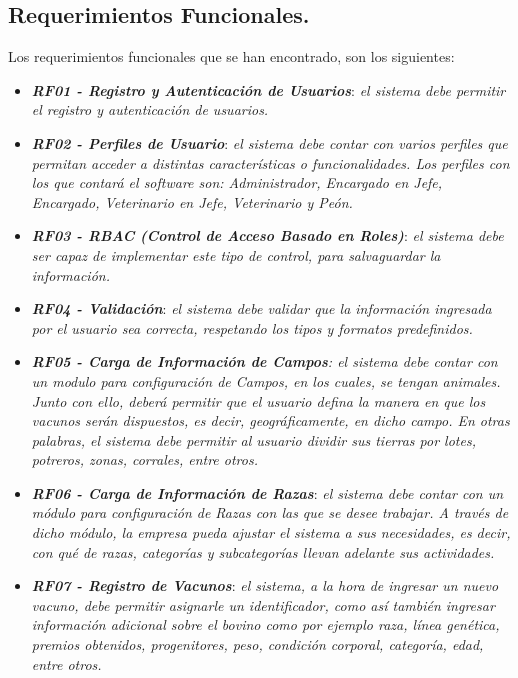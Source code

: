 \documentclass[11pt,oneside]{book}
\begin{document}
\subsection{Requerimientos Funcionales.}
Los requerimientos funcionales que se han encontrado, son los siguientes:
\begin{itemize}

\item \textit{\textbf{RF01 - Registro y Autenticación de Usuarios}}: \textit{el sistema debe permitir el registro y autenticación de usuarios.}

\item \textit{\textbf{RF02 - Perfiles de Usuario}}: \textit{el sistema debe contar con varios perfiles que permitan acceder a distintas características o funcionalidades. Los perfiles con los que contará el software son: Administrador, Encargado en Jefe, Encargado, Veterinario en Jefe, Veterinario y Peón.}
\newpage
\item \textit{\textbf{RF03 - RBAC (Control de Acceso Basado en Roles)}}: \textit{el sistema debe ser capaz de implementar este tipo de control, para salvaguardar la información.}

\item \textit{\textbf{RF04 - Validación}}: \textit{el sistema debe validar que la información ingresada por el usuario sea correcta, respetando los tipos y formatos predefinidos.}

\item \textit{\textbf{RF05 - Carga de Información de Campos}: el sistema debe contar con un modulo para configuración de Campos, en los cuales, se tengan animales. Junto con ello, deberá permitir que el usuario defina la manera en que los vacunos serán dispuestos, es decir, geográficamente, en dicho campo. En otras palabras, el sistema debe permitir al usuario dividir sus tierras por lotes, potreros, zonas, corrales, entre otros.}

\item \textit{\textbf{RF06 - Carga de Información de Razas}}: \textit{el sistema debe contar con un módulo para configuración de Razas con las que se desee trabajar. A través de dicho módulo, la empresa pueda ajustar el sistema a sus necesidades, es decir, con qué de razas, categorías y subcategorías llevan adelante sus actividades.}

\item \textit{\textbf{RF07 - Registro de Vacunos}}: \textit{el sistema, a la hora de ingresar un nuevo vacuno, debe permitir asignarle un identificador, como así también ingresar información adicional sobre el bovino como por ejemplo raza, línea genética, premios obtenidos, progenitores, peso, condición corporal, categoría, edad, entre otros.}


\end{itemize}
\end{document}
